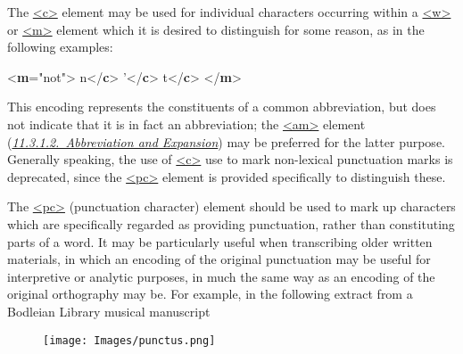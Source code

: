 The \hyperref[TEI.c]{<c>} element may be used for individual characters occurring within a \hyperref[TEI.w]{<w>} or \hyperref[TEI.m]{<m>} element which it is desired to distinguish for some reason, as in the following examples: \par\bgroup{}\exampleFont \begin{shaded}\noindent\mbox{}{<\textbf{m}\hspace*{1em}{baseForm}="{not}">}\mbox{}\newline 
{}n{</\textbf{c}>}\mbox{}\newline 
{}'{</\textbf{c}>}\mbox{}\newline 
{}t{</\textbf{c}>}\mbox{}\newline 
{</\textbf{m}>}\end{shaded}\egroup\par \noindent  This encoding represents the constituents of a common abbreviation, but does not indicate that it is in fact an abbreviation; the \hyperref[TEI.am]{<am>} element (\textit{\hyperref[PHAB]{11.3.1.2.\ Abbreviation and Expansion}}) may be preferred for the latter purpose. Generally speaking, the use of \hyperref[TEI.c]{<c>} use to mark non-lexical punctuation marks is deprecated, since the \hyperref[TEI.pc]{<pc>} element is provided specifically to distinguish these.\par
The \hyperref[TEI.pc]{<pc>} (punctuation character) element should be used to mark up characters which are specifically regarded as providing punctuation, rather than constituting parts of a word. It may be particularly useful when transcribing older written materials, in which an encoding of the original punctuation may be useful for interpretive or analytic purposes, in much the same way as an encoding of the original orthography may be. For example, in the following extract from a Bodleian Library musical manuscript \begin{figure}[htbp]
\noindent\noindent\texttt{[image: Images/punctus.png]}\end{figure}
